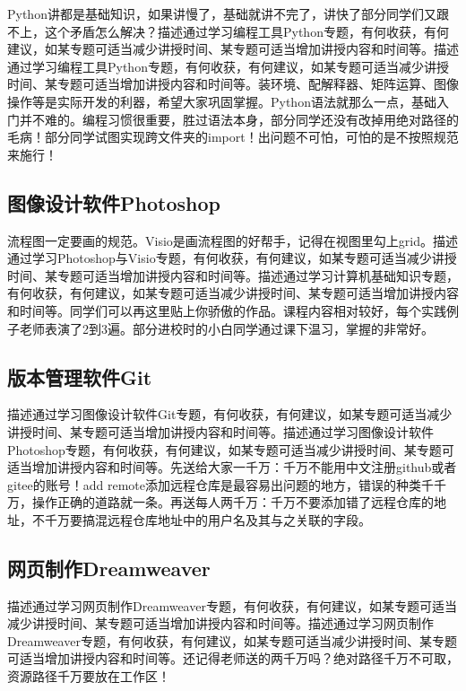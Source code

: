 \documentclass[supercite]{Experimental_Report}
\theoremstyle{definition}
\begin{document}
	Python讲都是基础知识，如果讲慢了，基础就讲不完了，讲快了部分同学们又跟不上，这个矛盾怎么解决？描述通过学习编程工具Python专题，有何收获，有何建议，如某专题可适当减少讲授时间、某专题可适当增加讲授内容和时间等。描述通过学习编程工具Python专题，有何收获，有何建议，如某专题可适当减少讲授时间、某专题可适当增加讲授内容和时间等。装环境、配解释器、矩阵运算、图像操作等是实际开发的利器，希望大家巩固掌握。Python语法就那么一点，基础入门并不难的。编程习惯很重要，胜过语法本身，部分同学还没有改掉用绝对路径的毛病！部分同学试图实现跨文件夹的import！出问题不可怕，可怕的是不按照规范来施行！
	
	\subsection{图像设计软件Photoshop}
	
	流程图一定要画的规范。Visio是画流程图的好帮手，记得在视图里勾上grid。描述通过学习Photoshop与Visio专题，有何收获，有何建议，如某专题可适当减少讲授时间、某专题可适当增加讲授内容和时间等。描述通过学习计算机基础知识专题，有何收获，有何建议，如某专题可适当减少讲授时间、某专题可适当增加讲授内容和时间等。同学们可以再这里贴上你骄傲的作品。课程内容相对较好，每个实践例子老师表演了2到3遍。部分进校时的小白同学通过课下温习，掌握的非常好。
	
	\subsection{版本管理软件Git}
	
	描述通过学习图像设计软件Git专题，有何收获，有何建议，如某专题可适当减少讲授时间、某专题可适当增加讲授内容和时间等。描述通过学习图像设计软件Photoshop专题，有何收获，有何建议，如某专题可适当减少讲授时间、某专题可适当增加讲授内容和时间等。先送给大家一千万：千万不能用中文注册github或者gitee的账号！add remote添加远程仓库是最容易出问题的地方，错误的种类千千万，操作正确的道路就一条。再送每人两千万：千万不要添加错了远程仓库的地址，不千万要搞混远程仓库地址中的用户名及其与之关联的字段。
	
	\subsection{网页制作Dreamweaver}
	
	描述通过学习网页制作Dreamweaver专题，有何收获，有何建议，如某专题可适当减少讲授时间、某专题可适当增加讲授内容和时间等。描述通过学习网页制作Dreamweaver专题，有何收获，有何建议，如某专题可适当减少讲授时间、某专题可适当增加讲授内容和时间等。还记得老师送的两千万吗？绝对路径千万不可取，资源路径千万要放在工作区！
	
\end{document}
